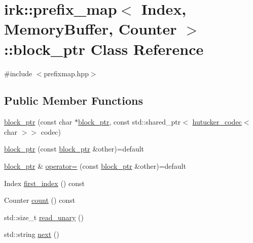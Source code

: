 \hypertarget{classirk_1_1prefix__map_1_1block__ptr}{}\section{irk\+:\+:prefix\+\_\+map$<$ Index, Memory\+Buffer, Counter $>$\+:\+:block\+\_\+ptr Class Reference}
\label{classirk_1_1prefix__map_1_1block__ptr}


{\ttfamily \#include $<$prefixmap.\+hpp$>$}

\subsection*{Public Member Functions}
\begin{DoxyCompactItemize}
\item 
\mbox{\hyperlink{classirk_1_1prefix__map_1_1block__ptr_abd70038e4a11fca54427b6b439cc4263}{block\+\_\+ptr}} (const char $\ast$\mbox{\hyperlink{classirk_1_1prefix__map_1_1block__ptr}{block\+\_\+ptr}}, const std\+::shared\+\_\+ptr$<$ \mbox{\hyperlink{classirk_1_1hutucker__codec}{hutucker\+\_\+codec}}$<$ char $>$$>$ codec)
\item 
\mbox{\hyperlink{classirk_1_1prefix__map_1_1block__ptr_a4e7e5d0950f932fe13cb44701aa43d40}{block\+\_\+ptr}} (const \mbox{\hyperlink{classirk_1_1prefix__map_1_1block__ptr}{block\+\_\+ptr}} \&other)=default
\item 
\mbox{\hyperlink{classirk_1_1prefix__map_1_1block__ptr}{block\+\_\+ptr}} \& \mbox{\hyperlink{classirk_1_1prefix__map_1_1block__ptr_a095e7ba450fb5a91e4a9d18d999c8b8b}{operator=}} (const \mbox{\hyperlink{classirk_1_1prefix__map_1_1block__ptr}{block\+\_\+ptr}} \&other)=default
\item 
Index \mbox{\hyperlink{classirk_1_1prefix__map_1_1block__ptr_a501892be0f2a245b8982045c3d3febc1}{first\+\_\+index}} () const
\item 
Counter \mbox{\hyperlink{classirk_1_1prefix__map_1_1block__ptr_a98fc3e949cae9309b0b621bfa1854c70}{count}} () const
\item 
std\+::size\+\_\+t \mbox{\hyperlink{classirk_1_1prefix__map_1_1block__ptr_afe1fc5491585abf3d5e03174fc9399b9}{read\+\_\+unary}} ()
\item 
std\+::string \mbox{\hyperlink{classirk_1_1prefix__map_1_1block__ptr_a8dcec33c10dd801c885773b4a2eda2c2}{next}} ()
\end{DoxyCompactItemize}


